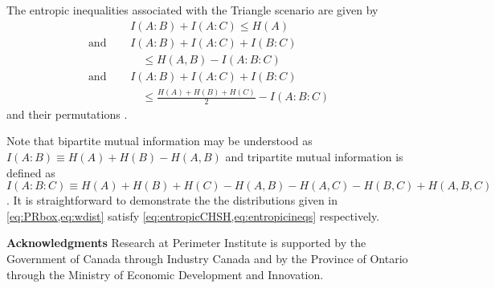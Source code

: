 The entropic inequalities associated with the Triangle scenario are given by 
\begin{align}\label{eq:entropicineqs}
\nonumber &I\!\left(A:B\right)+I\!\left(A:C\right)\leq H\!\left(A\right) \\
\nonumber \text{and }\quad&I\!\left(A:B\right)+I\!\left(A:C\right)+I\!\left(B:C\right)\\
&\quad \leq H\!\left(A,B\right)-I\!\left(A:B:C\right)\\
\nonumber \text{and }\quad & I\!\left(A:B\right)+I\!\left(A:C\right)+I\!\left(B:C\right)\\
\nonumber &\quad \leq\frac{H\!\left(A\right)+H\!\left(B\right)+H\!\left(C\right)}{2}-I\!\left(A:B:C\right)
\end{align}
and their permutations \cite{chaves2014novel,Chaves2015infoquantum,pusey2014gdag}.

Note that bipartite mutual information may be understood as $I\!\left(A:B\right)\equiv H\!\left(A\right)+H\!\left(B\right)-H\!\left(A,B\right)$ and tripartite mutual information is defined as $I\!\left(A:B:C\right)\equiv H\!\left(A\right)+H\!\left(B\right)+H\!\left(C\right)-H\!\left(A,B\right)-H\!\left(A,C\right)-H\!\left(B,C\right)+H\!\left(A,B,C\right)$. It is straightforward to demonstrate the the distributions given in \cref{eq:PRbox,eq:wdist} satisfy  \cref{eq:entropicCHSH,eq:entropicineqs} respectively.



\begin{acknowledgments}
\bigskip\noindent\textbf{Acknowledgments}
Research at Perimeter Institute is supported by the Government of Canada through Industry Canada and by the Province of Ontario through the Ministry of Economic Development and Innovation.
\end{acknowledgments}

\nocite{*}
\setlength{\bibsep}{\smallskipamount}





